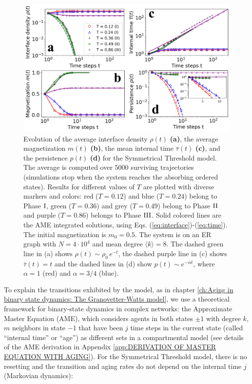\begin{figure}[ht]
	\centering \captionsetup{font=sf}
	\includegraphics[width=\textwidth]{Figs/Aging_STM/FIG3.pdf}
	\caption[Symmetrical Threshold model dynamics in random networks]{\label{fig:evolution_random} Evolution of the average interface density $\rho(t)$ \textbf{(a)}, the average magnetization $m(t)$ \textbf{(b)}, the mean internal time $\bar{\tau}(t)$ \textbf{(c)}, and the persistence $p(t)$ \textbf{(d)} for the Symmetrical Threshold model. The average is computed over $5000$ surviving trajectories (simulations stop when the system reaches the absorbing ordered states). Results for different values of $T$ are plotted with diverse markers and colors: red ($T = 0.12$) and blue ($T = 0.24$) belong to Phase ${\rm I}$, green ($T = 0.36$) and grey ($T = 0.49$) belong to Phase ${\rm II}$ and purple ($T = 0.86$) belongs to Phase ${\rm III}$. Solid colored lines are the AME integrated solutions, using Eqs. (\ref{eq:interface})-(\ref{eq:time}). The initial magnetization is $m_0 = 0.5$. The system is on an ER graph with $N = 4 \cdot 10^4$ and mean degree $\langle k \rangle = 8$. The dashed green line in (a) shows $\rho(t) \sim \rho_0 \, e^{-t}$, the dashed purple line in (c) shows $\bar{\tau}(t) = t$ and the dashed lines in (d) show $p(t) \sim e^{-\alpha t}$, where $\alpha = 1$ (red) and $\alpha = 3/4$ (blue). 
	}
\end{figure}
To explain the transitions exhibited by the model, as in chapter \ref{ch:Aging in binary state dynamics: The Granovetter-Watts model}, we use a theoretical framework for binary-state dynamics in complex networks: the Approximate Master Equation (AME), which considers agents in both states $\pm 1$ with degree $k$, $m$ neighbors in state $-1$ that have been $j$ time steps in the current state (called ``internal time'' or ``age'') as different sets in a compartmental model (see details of the AME derivation in Appendix \ref{app:DERIVATION OF MASTER EQUATION WITH AGING}). For the Symmetrical Threshold model, there is no resetting and the transition and aging rates do not depend on the internal time $j$ (Markovian dynamics):

